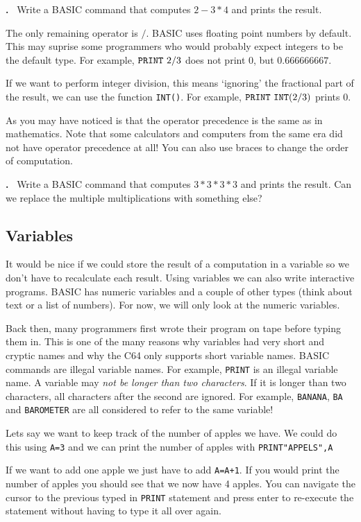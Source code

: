\documentclass{article}
\newcounter{problem}
\newcounter{solution}
\newcommand\problem{%
  \stepcounter{problem}%
  \textbf{\theproblem.}~%
  \setcounter{solution}{0}%
}
\begin{document}
\problem Write a BASIC command that computes $2 - 3 * 4$ and prints the result.

The only remaining operator is $/$.
BASIC uses floating point numbers by default.
This may suprise some programmers who would probably expect integers to be the default type.
For example, $\verb:PRINT:\ 2/3$ does not print $0$, but $0.666666667$.

If we want to perform integer division, this means `ignoring' the fractional part of the result, we can use the function \verb:INT():.
For example, $\verb:PRINT:\ \verb:INT:(2/3)$ prints $0$.

As you may have noticed is that the operator precedence is the same as in mathematics.
Note that some calculators and computers from the same era did not have operator precedence at all!
You can also use braces to change the order of computation.

\problem Write a BASIC command that computes $3*3*3*3$ and prints the result.
Can we replace the multiple multiplications with something else?

\subsection{Variables}

It would be nice if we could store the result of a computation in a variable so we don't have to recalculate each result.
Using variables we can also write interactive programs.
BASIC has numeric variables and a couple of other types (think about text or a list of numbers).
For now, we will only look at the numeric variables.

Back then, many programmers first wrote their program on tape before typing them in.
This is one of the many reasons why variables had very short and cryptic names and why the C64 only supports short variable names.
BASIC commands are illegal variable names.
For example, \verb:PRINT: is an illegal variable name.
A variable may \emph{not be longer than two characters}.
If it is longer than two characters, all characters after the second are ignored.
For example, \verb:BANANA:, \verb:BA: and \verb:BAROMETER: are all considered to refer to the same variable!

Lets say we want to keep track of the number of apples we have.
We could do this using \verb:A=3: and we can print the number of apples with \verb:PRINT"APPELS",A:

If we want to add one apple we just have to add \verb:A=A+1:.
If you would print the number of apples you should see that we now have 4 apples.
You can navigate the cursor to the previous typed in \verb:PRINT: statement and press enter to re-execute the statement without having to type it all over again.
\end{document}
